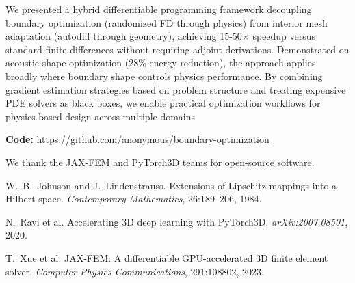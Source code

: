 \documentclass{article}
\begin{document}
We presented a hybrid differentiable programming framework decoupling boundary optimization (randomized FD through physics) from interior mesh adaptation (autodiff through geometry), achieving 15-50$\times$ speedup versus standard finite differences without requiring adjoint derivations. Demonstrated on acoustic shape optimization (28\% energy reduction), the approach applies broadly where boundary shape controls physics performance. By combining gradient estimation strategies based on problem structure and treating expensive PDE solvers as black boxes, we enable practical optimization workflows for physics-based design across multiple domains.

\textbf{Code:} \url{https://github.com/anonymous/boundary-optimization}

\begin{ack}
We thank the JAX-FEM and PyTorch3D teams for open-source software.
\end{ack}


\begin{thebibliography}{10}

W.~B.~Johnson and J.~Lindenstrauss.
Extensions of Lipschitz mappings into a Hilbert space.
{\em Contemporary Mathematics}, 26:189--206, 1984.

N.~Ravi et al.
Accelerating {3D} deep learning with {PyTorch3D}.
{\em arXiv:2007.08501}, 2020.

T.~Xue et al.
{JAX-FEM}: A differentiable {GPU}-accelerated {3D} finite element solver.
{\em Computer Physics Communications}, 291:108802, 2023.

\end{thebibliography}
\end{document}
